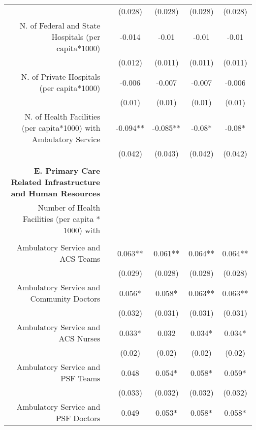 \begin{table}[h!]
\begin{footnotesize}
\begin{center}
{\begin{threeparttable}[b]
\begin{tabular}{rrcccc}
          &       & (0.028) & (0.028) & (0.028) &  (0.028)  \\
    \multicolumn{1}{p{29.785em}}{N. of Federal and State Hospitals (per capita*1000)} &       & -0.014 & -0.01 & -0.01 &  -0.01  \\
          &       & (0.012) & (0.011) & (0.011) &  (0.011)  \\
    \multicolumn{1}{p{29.785em}}{N. of Private Hospitals (per capita*1000)} &       & -0.006 & -0.007 & -0.007 &  -0.006  \\
          &       & (0.01) & (0.01) & (0.01) &  (0.01)  \\
    \multicolumn{1}{p{29.785em}}{N. of Health Facilities (per capita*1000) with Ambulatory Service} &       & -0.094** & -0.085** & -0.08* &  -0.08*  \\
          &       & (0.042) & (0.043) & (0.042) &  (0.042)  \\
          &       &       &       &       &  \\
    \midrule
    \multicolumn{1}{p{29.785em}}{\textbf{E. Primary Care Related Infrastructure and Human Resources}} &       &       &       &       &  \\
    \multicolumn{1}{p{29.785em}}{Number of Health Facilities (per capita * 1000) with} &       &       &       &       &  \\
          &       &       &       &       &  \\
    \multicolumn{1}{p{29.785em}}{Ambulatory Service and ACS Teams} &       & 0.063** & 0.061** & 0.064** &  0.064**  \\
          &       & (0.029) & (0.028) & (0.028) &  (0.028)  \\
    \multicolumn{1}{p{29.785em}}{Ambulatory Service and Community Doctors} &       & 0.056* & 0.058* & 0.063** &  0.063**  \\
          &       & (0.032) & (0.031) & (0.031) &  (0.031)  \\
    \multicolumn{1}{p{29.785em}}{Ambulatory Service and ACS Nurses} &       & 0.033* & 0.032 & 0.034* &  0.034*  \\
          &       & (0.02) & (0.02) & (0.02) &  (0.02)  \\
    \multicolumn{1}{p{29.785em}}{Ambulatory Service and PSF Teams} &       & 0.048 & 0.054* & 0.058* &  0.059*  \\
          &       & (0.033) & (0.032) & (0.032) &  (0.032)  \\
    \multicolumn{1}{p{29.785em}}{Ambulatory Service and PSF Doctors} &       & 0.049 & 0.053* & 0.058* &  0.058*  \\

\end{tabular}
\end{threeparttable}}
\end{center}
\end{footnotesize}
\end{table}
